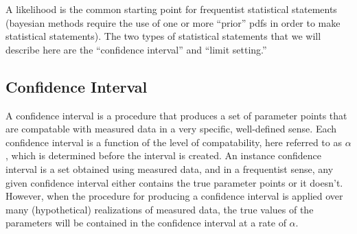 
A likelihood is the common starting point for frequentist statistical statements (bayesian methods require the use of one or more ``prior'' pdfs in order to make statistical statements).
The two types of statistical statements that we will describe here are the ``confidence interval'' and ``limit setting.''

\subsection{Confidence Interval}

A confidence interval is a procedure that produces a set of parameter points that are compatable with measured data in a very specific, well-defined sense.
Each confidence interval is a function of the level of compatability, here referred to as $\alpha$, which is determined before the interval is created.
An instance confidence interval is a set obtained using measured data, and in a frequentist sense, any given confidence interval either contains the true parameter points or it doesn't.
However, when the procedure for producing a confidence interval is applied over many (hypothetical) realizations of measured data, the true values of the parameters will be contained in the confidence interval at a rate of $\alpha$.


